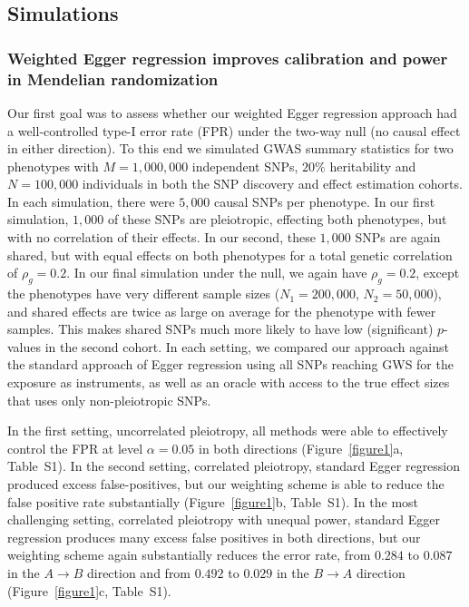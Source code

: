\documentclass{article}
\begin{document}
\subsection*{Simulations}
\subsubsection*{Weighted Egger regression improves calibration and power in Mendelian randomization}
Our first goal was to assess whether our weighted Egger regression approach
had a well-controlled type-I error rate (FPR) under the two-way null
(no causal effect in either direction). To this
end we simulated GWAS summary statistics for two phenotypes with $M=1,000,000$
independent SNPs, $20\%$ heritability and $N = 100,000$ individuals in both
 the SNP discovery and effect estimation cohorts. In each simulation, there
 were $5,000$ causal
SNPs per phenotype. In our first simulation, $1,000$ of these SNPs are pleiotropic,
effecting both phenotypes, but with no correlation of their effects. In our
second, these $1,000$ SNPs are again shared, but with equal effects on both phenotypes
for a total genetic correlation of $\rho_g = 0.2$. In our final simulation under the
null, we again have $\rho_g = 0.2$, except the phenotypes have very different sample sizes
($N_1 = 200,000$, $N_2 = 50,000$), and shared effects are twice as large on average
for the phenotype with fewer samples. This makes shared SNPs much more likely to have
low (significant) $p$-values in the second cohort. In each setting, we compared our approach
against the standard approach of Egger regression using all SNPs reaching GWS for
 the exposure as instruments, as well as an oracle with access to the true
effect sizes that uses only non-pleiotropic SNPs.

In the first setting, uncorrelated pleiotropy, all methods were able to 
effectively control the FPR at level $\alpha = 0.05$ in both directions
(Figure~\ref{figure1}a, Table~S1).
In the second setting, correlated pleiotropy,
standard Egger regression produced excess false-positives, but our weighting
scheme is able to reduce the false positive rate substantially
(Figure~\ref{figure1}b, Table~S1).  In the most challenging setting,
correlated pleiotropy with unequal power, standard Egger regression produces
many excess false positives in both directions, but our weighting scheme
again substantially reduces the error rate, from $0.284$ to $0.087$ in
the $A\rightarrow B$ direction and from $0.492$ to $0.029$ in the 
$B\rightarrow A$ direction (Figure~\ref{figure1}c, Table~S1).
\end{document}
